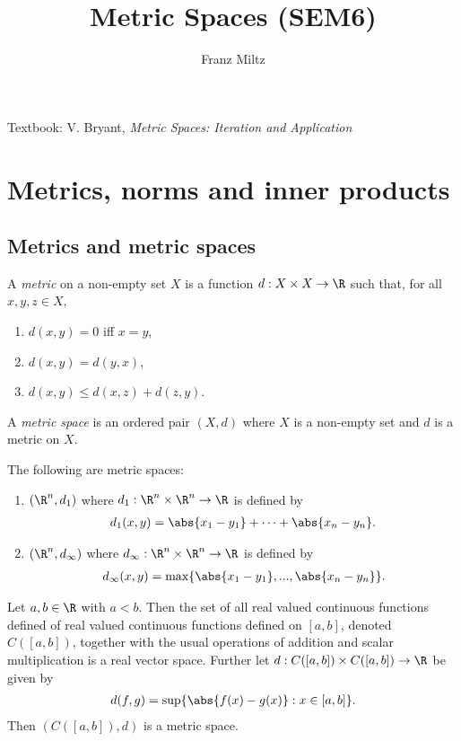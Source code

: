 \documentclass{article}
\begin{document}
\mkthmstwounified
\title{Metric Spaces (SEM6)}
\author{Franz Miltz}
\maketitle
\noindent Textbook: V. Bryant, \emph{Metric Spaces: Iteration and Application}
\tableofcontents
\pagebreak

\section{Metrics, norms and inner products}

\subsection{Metrics and metric spaces}

\begin{definition}
	A \emph{metric} on a non-empty set $X$ is a function $d:X\times X\to\R$
	such that, for all $x,y,z\in X$,
	\begin{enumerate}
		\item $d(x,y)=0$ iff $x=y$,
		\item $d(x,y)=d(y,x)$,
		\item $d(x,y)\leq d(x,z) + d(z,y)$.
	\end{enumerate}
	A \emph{metric space} is an ordered pair $(X,d)$ where $X$ is a non-empty set and
	$d$ is a metric on $X$.
\end{definition}

\begin{lemma}
	The following are metric spaces:
	\begin{enumerate}
		\item $(\R^n, d_1)$ where $d_1:\R^n\times\R^n\to\R$ is defined by \begin{align*}
			      d_1(x,y)=\abs{x_1-y_1}+\cdots+\abs{x_n-y_n}.
		      \end{align*}
		\item $(\R^n, d_\infty)$ where $d_\infty:\R^n\times\R^n\to\R$ is defined by \begin{align*} d_\infty(x,y)=\max\{\abs{x_1-y_1},...,\abs{x_n-y_n}\}.
		      \end{align*}
	\end{enumerate}
\end{lemma}

\begin{lemma}
	Let $a,b\in\R$ with $a<b$.
	Then the set of all real valued continuous functions defined of real valued
	continuous functions defined on $[a,b]$, denoted $C([a,b])$, together with
	the usual operations of addition and scalar multiplication is a real
	vector space.
	Further let $d:C([a,b])\times C([a,b])\to \R$ be given by
	\begin{align}
		\label{metric-cab}
		d(f,g)=\sup\{\abs{f(x)-g(x)}:x\in[a,b]\}.
	\end{align}
	Then $(C([a,b]),d)$ is a metric space.
\end{lemma}
\end{document}
